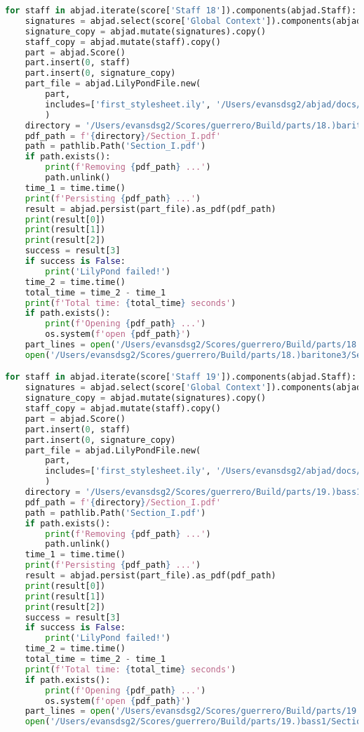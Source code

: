 \begin{lstlisting}[language=Python, caption=Invocation Source Code]
for staff in abjad.iterate(score['Staff 18']).components(abjad.Staff):
    signatures = abjad.select(score['Global Context']).components(abjad.Staff)
    signature_copy = abjad.mutate(signatures).copy()
    staff_copy = abjad.mutate(staff).copy()
    part = abjad.Score()
    part.insert(0, staff)
    part.insert(0, signature_copy)
    part_file = abjad.LilyPondFile.new(
        part,
        includes=['first_stylesheet.ily', '/Users/evansdsg2/abjad/docs/source/_stylesheets/abjad.ily'],
        )
    directory = '/Users/evansdsg2/Scores/guerrero/Build/parts/18.)baritone3'
    pdf_path = f'{directory}/Section_I.pdf'
    path = pathlib.Path('Section_I.pdf')
    if path.exists():
        print(f'Removing {pdf_path} ...')
        path.unlink()
    time_1 = time.time()
    print(f'Persisting {pdf_path} ...')
    result = abjad.persist(part_file).as_pdf(pdf_path)
    print(result[0])
    print(result[1])
    print(result[2])
    success = result[3]
    if success is False:
        print('LilyPond failed!')
    time_2 = time.time()
    total_time = time_2 - time_1
    print(f'Total time: {total_time} seconds')
    if path.exists():
        print(f'Opening {pdf_path} ...')
        os.system(f'open {pdf_path}')
    part_lines = open('/Users/evansdsg2/Scores/guerrero/Build/parts/18.)baritone3/Section_I.ly').readlines()
    open('/Users/evansdsg2/Scores/guerrero/Build/parts/18.)baritone3/Section_I.ly', 'w').writelines(part_lines[15:-1])

for staff in abjad.iterate(score['Staff 19']).components(abjad.Staff):
    signatures = abjad.select(score['Global Context']).components(abjad.Staff)
    signature_copy = abjad.mutate(signatures).copy()
    staff_copy = abjad.mutate(staff).copy()
    part = abjad.Score()
    part.insert(0, staff)
    part.insert(0, signature_copy)
    part_file = abjad.LilyPondFile.new(
        part,
        includes=['first_stylesheet.ily', '/Users/evansdsg2/abjad/docs/source/_stylesheets/abjad.ily'],
        )
    directory = '/Users/evansdsg2/Scores/guerrero/Build/parts/19.)bass1'
    pdf_path = f'{directory}/Section_I.pdf'
    path = pathlib.Path('Section_I.pdf')
    if path.exists():
        print(f'Removing {pdf_path} ...')
        path.unlink()
    time_1 = time.time()
    print(f'Persisting {pdf_path} ...')
    result = abjad.persist(part_file).as_pdf(pdf_path)
    print(result[0])
    print(result[1])
    print(result[2])
    success = result[3]
    if success is False:
        print('LilyPond failed!')
    time_2 = time.time()
    total_time = time_2 - time_1
    print(f'Total time: {total_time} seconds')
    if path.exists():
        print(f'Opening {pdf_path} ...')
        os.system(f'open {pdf_path}')
    part_lines = open('/Users/evansdsg2/Scores/guerrero/Build/parts/19.)bass1/Section_I.ly').readlines()
    open('/Users/evansdsg2/Scores/guerrero/Build/parts/19.)bass1/Section_I.ly', 'w').writelines(part_lines[15:-1])


\end{lstlisting}
